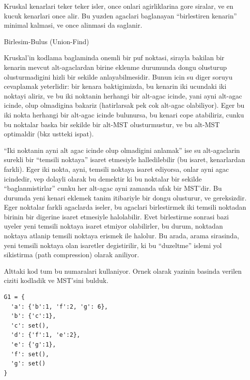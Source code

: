 \documentclass[12pt,fleqn]{article}\usepackage{../common}
\begin{document}
Kruskal kenarlari teker teker isler, once onlari agirliklarina gore
siralar, ve en kucuk kenarlari once alir. Bu yuzden agaclari baglanayan
``birlestiren kenarin'' minimal kalmasi, ve once alinmasi da saglanir.

Birlesim-Bulus (Union-Find)

Kruskal'in kodlama baglaminda onemli bir puf noktasi, sirayla bakilan bir
kenarin mevcut alt-agaclardan birine eklenme durumunda dongu olusturup
olusturmadigini hizli bir sekilde anlayabilmesidir. Bunun icin su diger
soruyu cevaplamak yeterlidir: bir kenara baktigimizda, bu kenarin iki
ucundaki iki noktayi aliriz, ve bu iki noktanin herhangi bir alt-agac
icinde, yani ayni alt-agac icinde, olup olmadigina bakariz (hatirlarsak pek
cok alt-agac olabiliyor). Eger bu iki nokta herhangi bir alt-agac icinde
bulunursa, bu kenari cope atabiliriz, cunku bu noktalar baska bir sekilde
bir alt-MST olusturmustur, ve bu alt-MST optimaldir (bkz ustteki ispat).

``Iki noktanin ayni alt agac icinde olup olmadigini anlamak'' ise su
alt-agaclarin surekli bir ``temsili noktaya'' isaret etmesiyle
halledilebilir (bu isaret, kenarlardan farkli). Eger iki nokta, ayni,
temsili noktaya isaret ediyorsa, onlar ayni agac icindedir, vep dolayli
olarak bu demektir ki bu noktalar bir sekilde ``baglanmistirlar'' cunku her
alt-agac ayni zamanda ufak bir MST'dir. Bu durumda yeni kenari eklemek
tanim itibariyle bir dongu olusturur, ve gereksizdir. Eger noktalar farkli
agaclarda iseler, bu agaclari birlestirmek iki temsili noktadan birinin bir
digerine isaret etmesiyle halolabilir. Evet birlestirme sonrasi bazi uyeler
yeni temsili noktaya isaret etmiyor olabilirler, bu durum, noktadan noktaya
atlanip temsili noktaya erismek ile halolur. Bu arada, arama sirasinda,
yeni temsili noktaya olan isaretler degistirilir, ki bu ``duzeltme'' islemi
yol sikistirma (path compression) olarak aniliyor.

Alttaki kod tum bu numaralari kullaniyor. Ornek olarak yazinin basinda
verilen ciziti kodladik ve MST'sini bulduk.

\begin{verbatim}
G1 = {
  'a': {'b':1, 'f':2, 'g': 6},
  'b': {'c':1},
  'c': set(),
  'd': {'f':1, 'e':2},
  'e': {'g':1},
  'f': set(),
  'g': set()
}
\end{verbatim}
\end{document}
